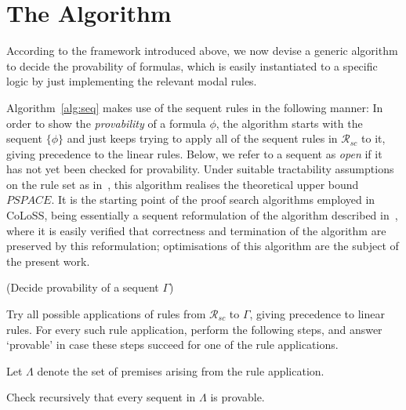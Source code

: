 \documentclass{entcs} \usepackage{entcsmacro}
\begin{document}
\section{The Algorithm}

According to the framework introduced above, we now devise a generic
algorithm to decide the provability of formulas, which is easily
instantiated to a specific logic by just implementing the relevant modal
rules.


Algorithm~\ref{alg:seq} makes use of the sequent rules in the
following manner: In order to show the \emph{provability} of a formula
$\phi$, the algorithm starts with the sequent $\{\phi\}$ and just
keeps trying to apply all of the sequent rules in $\mathcal{R}_{sc}$ to it,
giving precedence to the linear rules.  Below, we refer to a sequent
as \emph{open} if it has not yet been checked for provability. Under
suitable tractability assumptions on the rule set as
in~\cite{SchroderPattinson09,PattinsonSchroder08b}, this algorithm
realises the theoretical upper bound $\mathit{PSPACE}$. It is the
starting point of the proof search algorithms employed in CoLoSS,
being essentially a sequent reformulation of the algorithm described
in~\cite{CalinEA09}, where it is easily verified that correctness and termination
of the algorithm are preserved by this reformulation; optimisations of this
algorithm are the subject of the present work. 

\begin{alg}(Decide provability of a sequent $\Gamma$)
\begin{upshape}
 \begin{algenumerate}
   \item Try all possible applications of rules from $\mathcal{R}_{sc}$ to $\Gamma$, 
     giving precedence to linear rules. For every such rule application,
     perform the following steps, and answer `provable' in case these steps
     succeed for one of the rule applications.
   \item Let $\Lambda$ denote the  set of premises  arising from the rule 
     application.
   \item Check recursively that every sequent in $\Lambda$ is provable.
  \end{algenumerate}
\end{upshape}
\label{alg:seq}
\end{alg}
\end{document}
